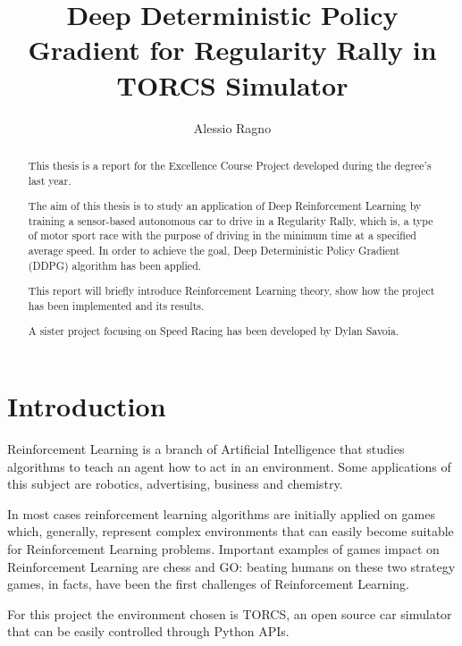 \documentclass[Lau,oneside,noexaminfo]{sapthesis} %
\title{Deep Deterministic Policy Gradient for Regularity Rally in TORCS Simulator}
\author{Alessio Ragno}
\begin{document}
\frontmatter
\maketitle
\dedication{Dedicato a\\Donald Knuth}
\begin{abstract}
This thesis is a report for the Excellence Course Project developed during the degree’s last year.

The aim of this thesis is to study an application of Deep Reinforcement Learning by training a sensor-based autonomous car to drive in a Regularity Rally, which is, a type of motor sport race with the purpose of driving in the minimum time at a specified average speed. In order to achieve the goal, Deep Deterministic Policy Gradient (DDPG) algorithm has been applied.

This report will briefly introduce Reinforcement Learning theory, show how the project has been implemented and its results.

A sister project focusing on Speed Racing has been developed by Dylan Savoia.

\end{abstract}
\begin{spacing}{0}
\tableofcontents
\end{spacing}
\mainmatter
\chapter{Introduction}
Reinforcement Learning is a branch of Artificial Intelligence that studies algorithms to teach an agent how to act in an environment. Some applications of this subject are robotics, advertising, business and chemistry. 

In most cases reinforcement learning algorithms are initially applied on games which, generally, represent complex environments that can easily become suitable for Reinforcement Learning problems. Important examples of games impact on Reinforcement Learning are chess and GO: beating humans on these two strategy games, in facts, have been the first challenges of Reinforcement Learning. 

For this project the environment chosen is TORCS, an open source car simulator that can be easily controlled through Python APIs.
\end{document}
